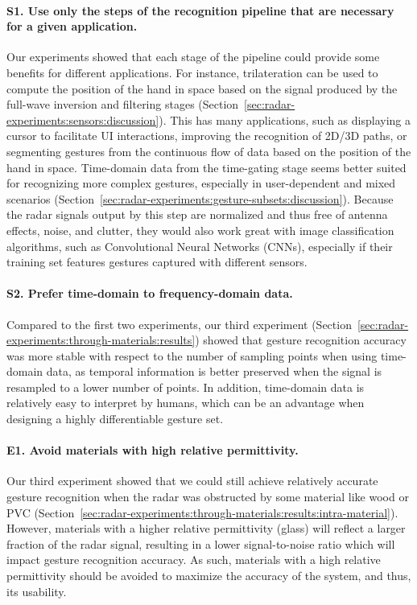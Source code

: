 


\paragraph{S1. Use only the steps of the recognition pipeline that are necessary for a given application.}
Our experiments showed that each stage of the pipeline could provide some benefits for different applications. 
%
For instance, trilateration can be used to compute the position of the hand in space based on the signal produced by the full-wave inversion and filtering stages (Section~\ref{sec:radar-experiments:sensors:discussion}). This has many applications, such as displaying a cursor to facilitate UI interactions, improving the recognition of 2D/3D paths, or segmenting gestures from the continuous flow of data based on the position of the hand in space.
%
Time-domain data from the time-gating stage seems better suited for recognizing more complex gestures, especially in user-dependent and mixed scenarios (Section~\ref{sec:radar-experiments:gesture-subsets:discussion}). 
Because the radar signals output by this step are normalized and thus free of antenna effects, noise, and clutter, they would also work great with image classification algorithms, such as Convolutional Neural Networks (CNNs), especially if their training set features gestures captured with different sensors.

\paragraph{S2. Prefer time-domain to frequency-domain data.}
Compared to the first two experiments, our third experiment (Section~\ref{sec:radar-experiments:through-materials:results}) showed that gesture recognition accuracy was more stable with respect to the number of sampling points when using time-domain data, as temporal information is better preserved when the signal is resampled to a lower number of points. In addition, time-domain data is relatively easy to interpret by humans, which can be an advantage when designing a highly differentiable gesture set.

\paragraph{E1. Avoid materials with high relative permittivity.} 
Our third experiment showed that we could still achieve relatively accurate gesture recognition when the radar was obstructed by some material like wood or PVC (Section~\ref{sec:radar-experiments:through-materials:results:intra-material}). 
%
However, materials with a higher relative permittivity (\eg glass) will reflect a larger fraction of the radar signal, resulting in a lower signal-to-noise ratio which will impact gesture recognition accuracy. 
%
As such, materials with a high relative permittivity should be avoided to maximize the accuracy of the system, and thus, its usability.

